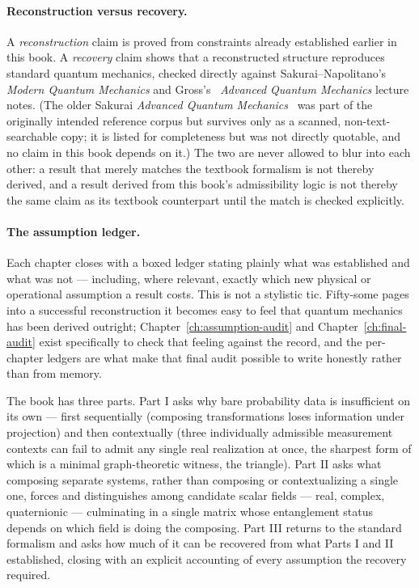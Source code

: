 \documentclass[11pt]{book}
\theoremstyle{plain}
\theoremstyle{definition}
\theoremstyle{remark}
\begin{document}
\paragraph{Reconstruction versus recovery.} A \emph{reconstruction} claim is
proved from constraints already established earlier in this book. A
\emph{recovery} claim shows that a reconstructed structure reproduces
standard quantum mechanics, checked directly against
Sakurai--Napolitano's~\cite{sakurainapolitano} \textit{Modern Quantum
Mechanics} and Gross's~\cite{gross} \textit{Advanced Quantum Mechanics}
lecture notes. (The older Sakurai \textit{Advanced Quantum
Mechanics}~\cite{sakurai} was part of the originally intended reference
corpus but survives only as a scanned, non-text-searchable copy; it is
listed for completeness but was not directly quotable, and no claim in
this book depends on it.) The two are never allowed
to blur into each other: a result that merely matches the textbook formalism
is not thereby derived, and a result derived from this book's admissibility
logic is not thereby the same claim as its textbook counterpart until the
match is checked explicitly.

\paragraph{The assumption ledger.} Each chapter closes with a boxed ledger
stating plainly what was established and what was not — including, where
relevant, exactly which new physical or operational assumption a result
costs. This is not a stylistic tic. Fifty-some pages into a successful
reconstruction it becomes easy to feel that quantum mechanics has been
derived outright; Chapter~\ref{ch:assumption-audit} and
Chapter~\ref{ch:final-audit} exist specifically to check that feeling against
the record, and the per-chapter ledgers are what make that final audit
possible to write honestly rather than from memory.

\bigskip

The book has three parts. Part I asks why bare probability data is
insufficient on its own — first sequentially (composing transformations loses
information under projection) and then contextually (three individually
admissible measurement contexts can fail to admit any single real
realization at once, the sharpest form of which is a minimal graph-theoretic
witness, the triangle). Part II asks what composing separate systems, rather
than composing or contextualizing a single one, forces and distinguishes
among candidate scalar fields — real, complex, quaternionic — culminating in
a single matrix whose entanglement status depends on which field is doing the
composing. Part III returns to the standard formalism and asks how much of
it can be recovered from what Parts I and II established, closing with an
explicit accounting of every assumption the recovery required.
\end{document}
